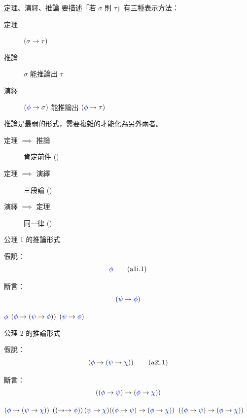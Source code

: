 \documentclass{Slideshow}
\begin{document}
\begin{frame}{定理、演繹、推論}
    要描述「若 $\sigma$ 則 $\tau$」有三種表示方法：
    \begin{description}
        \item[定理] $\left( \sigma \to \tau \right)$
        \item[推論] $\sigma$ 能推論出 $\tau$
        \item[演繹] $\left( {\color{blue}\phi} \to \sigma \right)$ 能推論出 $\left( {\color{blue}\phi} \to \tau \right)$
    \end{description}

    推論是最弱的形式，需要複雜的才能化為另外兩者。
    \begin{description}
        \item[定理 $\implies$ 推論] 肯定前件 ()
        \item[定理 $\implies$ 演繹] 三段論 ()
        \item[演繹 $\implies$ 定理] 同一律 ()
    \end{description}
\end{frame}

\begin{frame}{公理 1 的推論形式}
    \begin{theorem}[\mmurl{a1i}]
        假說：
        \[ {\color{blue}\phi} \tag{a1i.1} \]

        斷言：
        \[ \left( {\color{blue}\psi} \to {\color{blue}\phi} \right) \]

        \begin{mmproof}{2em}{3em}
                ${\color{blue}\phi}$
                \label{a1i:1}
                $\left( {\color{blue}\phi} \to \left( {\color{blue}\psi} \to {\color{blue}\phi} \right) \right)$
                \label{a1i:2}
                $\left( {\color{blue}\psi} \to {\color{blue}\phi} \right)$
        \end{mmproof}
    \end{theorem}
\end{frame}

\begin{frame}{公理 2 的推論形式}
    \begin{theorem}[\mmurl{a2i}]
        \newcommand{\hyp}{\wi\wph{\wi\wps\wch}}

        假說：
        \[ \hyp \tag{a2i.1} \]

        斷言：
        \[ \left( \left( {\color{blue}\phi} \to {\color{blue}\psi} \right) \to \left( {\color{blue}\phi} \to {\color{blue}\chi} \right) \right) \]

        \begin{mmproof}{2em}{3em}
                $\hyp$
                \label{a2i:1}
                $\wi\hyp{\aIIi\wph\wps\wch}$
                \label{a2i:2}
                $\left( \left( {\color{blue}\phi} \to {\color{blue}\psi} \right) \to \left( {\color{blue}\phi} \to {\color{blue}\chi} \right) \right)$
        \end{mmproof}
    \end{theorem}
\end{frame}
\end{document}
